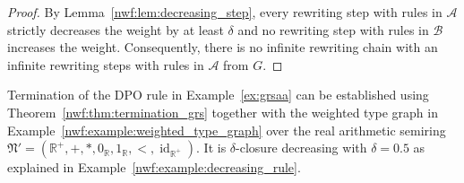 \begin{proof}

    By Lemma~\ref{nwf:lem:decreasing_step}, every rewriting step with rules in $\mathcal{A}$ strictly decreases the weight by at least $\delta$ and no rewriting step with rules in $\mathcal{B}$ increases the weight.
    Consequently, there is no infinite rewriting chain with an infinite rewriting steps with rules in $\mathcal{A}$ from $G$.
\end{proof}
\begin{example}
    \label{nwf:example:termination}
    Termination of the DPO rule in Example~\ref{ex:grsaa} can be established using Theorem~\ref{nwf:thm:termination_grs} together with the weighted type graph in Example~\ref{nwf:example:weighted_type_graph} over the real arithmetic semiring $\mathfrak{N}' \mathop{=} (\mathbb{R}^+,+,*,0_\mathbb{R},1_\mathbb{R},<,\operatorname{id}_{\mathbb{R}^+})$. It is $\delta$-closure decreasing with $\delta \mathop{=} 0.5$ as explained in Example~\ref{nwf:example:decreasing_rule}.
\end{example}

